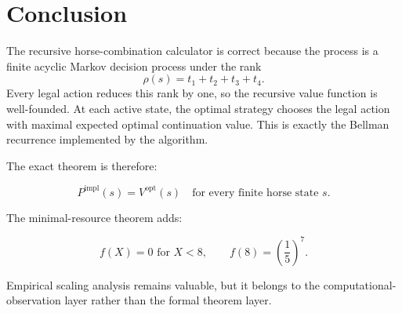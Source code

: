 \documentclass[11pt]{article}
\newcommand{\rank}{\rho}
\newcommand{\impl}{\mathrm{impl}}
\newcommand{\opt}{\mathrm{opt}}
\begin{document}
\section{Conclusion}

The recursive horse-combination calculator is correct because the process is a finite acyclic Markov decision process under the rank
\[
    \rank(s)=t_1+t_2+t_3+t_4.
\]
Every legal action reduces this rank by one, so the recursive value function is well-founded.  At each active state, the optimal strategy chooses the legal action with maximal expected optimal continuation value.  This is exactly the Bellman recurrence implemented by the algorithm.

The exact theorem is therefore:

\[
    \boxed{
    P^\impl(s)=V^\opt(s)
    \quad
    \text{for every finite horse state }s.
    }
\]

The minimal-resource theorem adds:

\[
    \boxed{
    f(X)=0\text{ for }X<8,
    \qquad
    f(8)=\left(\frac15\right)^7.
    }
\]

Empirical scaling analysis remains valuable, but it belongs to the computational-observation layer rather than the formal theorem layer.
\end{document}
